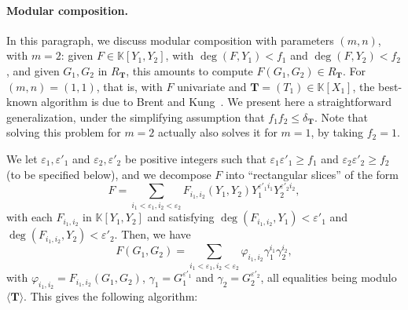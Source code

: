 \documentclass[12pt]{article}
\def\K {\ensuremath{\mathbb{K}}}
\def\Tt {\ensuremath{\mathbf{T}}}
\begin{document}
\paragraph{Modular composition.} 
In this paragraph, we discuss modular composition with parameters
$(m,n)$, with $m=2$: given $F \in \K[Y_1,Y_2]$, with $\deg(F,Y_1)<f_1$
and $\deg(F,Y_2)<f_2$, and given $G_1,G_2$ in $R_\Tt$, this amounts to
compute $F(G_1,G_2) \in R_\Tt$. For $(m,n)=(1,1)$, that is, with $F$
univariate and $\Tt=(T_1) \in \K[X_1]$, the best-known algorithm is
due to Brent and Kung~\cite{BrKu78}. We present here a straightforward
generalization, under the simplifying assumption that $f_1 f_2 \le
\delta_\Tt$. Note that solving this problem for $m=2$ actually also
solves it for $m=1$, by taking $f_2=1$.


We let $\varepsilon_1,\varepsilon'_1$ and
$\varepsilon_2,\varepsilon'_2$ be positive integers such that
$\varepsilon_1 \varepsilon'_1 \ge f_1$ and $\varepsilon_2
\varepsilon'_2 \ge f_2$ (to be specified below), and we decompose $F$
into ``rectangular slices'' of the form
\[
F=\sum_{i_1 < \varepsilon_1, i_2 < \varepsilon_2} F_{i_1,i_2}(Y_1,Y_2)
Y_1^{\varepsilon'_1 i_1} Y_2^{\varepsilon'_2 i_2},
\]
with each $F_{i_1,i_2}$ in $\K[Y_1,Y_2]$ and satisfying
$\deg(F_{i_1,i_2},Y_1)<\varepsilon'_1$ and
$\deg(F_{i_1,i_2},Y_2)<\varepsilon'_2$. Then, we have
\[
F(G_1,G_2) =\sum_{i_1 < \varepsilon_1, i_2 <
  \varepsilon_2}\varphi_{i_1,i_2} \gamma_1^{i_1} \gamma_2^{i_2},
\]
with $\varphi_{i_1,i_2}=F_{i_1,i_2}(G_1,G_2)$, $\gamma_1 =
G_1^{\varepsilon'_1}$ and $\gamma_2=G_2^{\varepsilon'_2}$, all
equalities being modulo $\langle \Tt \rangle$. This gives the
following algorithm:
\end{document}
